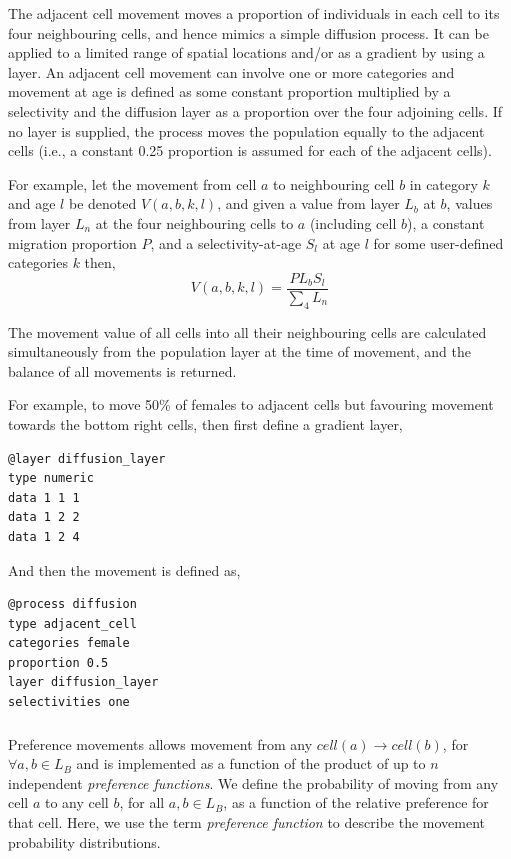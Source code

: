 The adjacent cell movement moves a proportion of individuals in each cell to its four neighbouring cells, and hence mimics a simple diffusion process. It can be applied to a limited range of spatial locations and/or as a gradient by using a layer. An adjacent cell movement can involve one or more categories and movement at age is defined as some constant proportion multiplied by a selectivity and the diffusion layer as a proportion over the four adjoining cells. If no layer is supplied, the process moves the population equally to the adjacent cells (i.e., a constant 0.25 proportion is assumed for each of the adjacent cells).

For example, let the movement from cell $a$ to neighbouring cell $b$ in category $k$ and age $l$ be denoted $V(a,b,k,l)$, and given a value from layer $L_b$  at $b$, values from layer $L_n$ at the four neighbouring cells to $a$ (including cell $b$), a constant migration proportion $P$, and a selectivity-at-age $S_l$ at age $l$ for some user-defined categories $k$ then, 
\begin{equation}
  V(a,b,k,l) = \frac{P L_b S_l }{\sum\limits_4 L_n}
\end{equation}

The movement value of all cells into all their neighbouring cells are calculated simultaneously from the population layer at the time of movement, and the balance of all movements is returned.

For example, to move 50\% of females to adjacent cells but favouring movement towards the bottom right cells, then first define a gradient layer, 

{\small{\begin{verbatim}
@layer diffusion_layer
type numeric
data 1 1 1
data 1 2 2
data 1 2 4
\end{verbatim}}}

And then the movement is defined as,

{\small{\begin{verbatim}
@process diffusion
type adjacent_cell
categories female
proportion 0.5
layer diffusion_layer
selectivities one
\end{verbatim}}}

\subsubsection{}

Preference movements allows movement from any $cell(a) \rightarrow cell(b)$, for $\forall a,b \in L_B$ and is implemented as a function of the product of up to $n$ independent \emph{preference functions}. We define the probability of moving from any cell $a$ to any cell $b$, for all $a,b \in L_B$, as a function of the relative preference for that cell. Here, we use the term \emph{preference function} \citep{1366,1367} to describe the movement probability distributions. 

